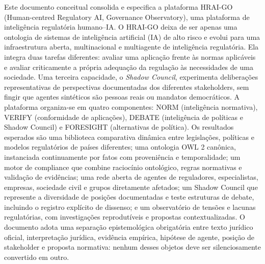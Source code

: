 \documentclass[12pt,a4paper,oneside,english,brazil]{abntex2}
\begin{document}

\pretextual
\imprimirfolhaderostorelatorio

\begin{resumorelatorio}
Este documento conceitual consolida e especifica a plataforma HRAI-GO (Human-centred Regulatory AI, Governance Observatory), uma plataforma de inteligência regulatória humano--IA. O HRAI-GO deixa de ser apenas uma ontologia de sistemas de inteligência artificial (IA) de alto risco e evolui para uma infraestrutura aberta, multinacional e multiagente de inteligência regulatória. Ela integra duas tarefas diferentes: avaliar uma aplicação frente às normas aplicáveis e avaliar criticamente a própria adequação da regulação às necessidades de uma sociedade. Uma terceira capacidade, o \textit{Shadow Council}, experimenta deliberações representativas de perspectivas documentadas dos diferentes stakeholders, sem fingir que agentes sintéticos são pessoas reais ou mandatos democráticos. A plataforma organiza-se em quatro componentes: NORM (inteligência normativa), VERIFY (conformidade de aplicações), DEBATE (inteligência de políticas e Shadow Council) e FORESIGHT (alternativas de política). Os resultados esperados são uma biblioteca comparativa dinâmica entre legislações, políticas e modelos regulatórios de países diferentes; uma ontologia OWL 2 canônica, instanciada continuamente por fatos com proveniência e temporalidade; um motor de compliance que combine raciocínio ontológico, regras normativas e validação de evidências; uma rede aberta de agentes de reguladores, especialistas, empresas, sociedade civil e grupos diretamente afetados; um Shadow Council que represente a diversidade de posições documentadas e teste estruturas de debate, incluindo o registro explícito de dissenso; e um observatório de tensões e lacunas regulatórias, com investigações reprodutíveis e propostas contextualizadas. O documento adota uma separação epistemológica obrigatória entre texto jurídico oficial, interpretação jurídica, evidência empírica, hipótese de agente, posição de stakeholder e proposta normativa: nenhum desses objetos deve ser silenciosamente convertido em outro.
\end{resumorelatorio}

\listoftables*
\cleardoublepage
\end{document}
